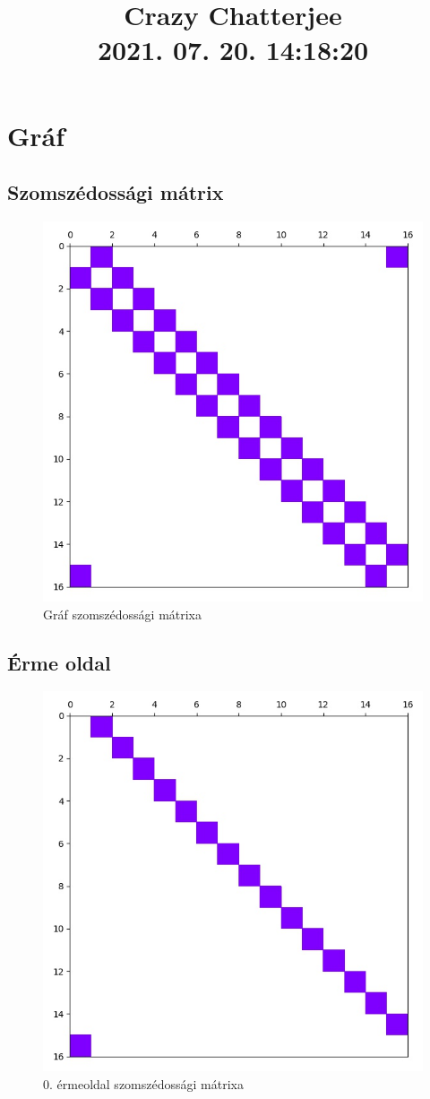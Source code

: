 \documentclass[14pt,a4paper]{article}
\title{Crazy Chatterjee \\ \large 2021. 07. 20. 14:18:20}
\author{}
\date{}
\begin{document}
\maketitle
\section{Gráf}
\subsection{Szomszédossági mátrix}
\begin{figure}[H]
\centering
\includegraphics[width = 0.7\columnwidth]{graph/graph.jpg}
\caption{Gráf szomszédossági mátrixa}
\end{figure}
\subsection{Érme oldal}
\begin{figure}[H]
\centering
\includegraphics[width = 0.7\columnwidth]{coin_faces/coin_face_00.jpg}
\caption{0. érmeoldal szomszédossági mátrixa}
\end{figure}
\end{document}
